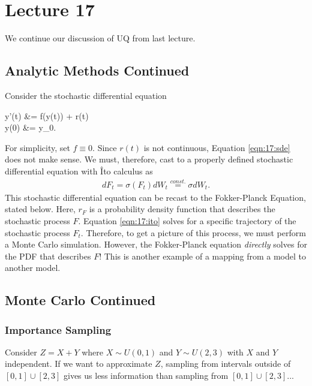 \chapter{Lecture 17}
We continue our discussion of UQ from last lecture.
\section{Analytic Methods Continued}
Consider the stochastic differential equation
\begin{ceqn} \label{eqn:17:sde}
    y'(t) &= f(y(t)) + r(t) \\
    y(0) &= y_0.
\end{ceqn}
For simplicity, set $f \equiv 0$. Since $r(t)$ is not continuous, Equation \eqref{eqn:17:sde} does not make sense. We must, therefore, cast to a properly defined stochastic differential equation with \^{I}to calculus as
\begin{align} \label{eqn:17:ito}
    dF_{t} = \sigma(F_t) dW_t \overset{const.}{=} \sigma dW_t.
\end{align}
This stochastic differential equation can be recast to the Fokker-Planck Equation, stated below.
Here, $r_{F}$ is a probability density function that describes the stochastic process $F$.  Equation \eqref{eqn:17:ito} solves for a specific trajectory of the stochastic process $F_t$. Therefore, to get a picture of this process, we must perform a Monte Carlo simulation. However, the Fokker-Planck equation \textit{directly} solves for the PDF that describes $F$! This is another example of a mapping from a model to another model. 

\section{Monte Carlo Continued}
\subsection{Importance Sampling}
Consider $Z = X + Y$ where $X \sim U(0,1)$ and $Y \sim U(2,3)$ with $X$ and $Y$ independent. If we want to approximate $Z$, sampling from intervals outside of $[0,1] \cup [2,3]$ gives us less information than sampling from $[0,1]\cup[2,3]$...

